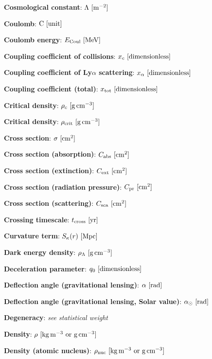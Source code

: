 \documentclass[a4paper,10pt]{article}
\begin{document}
{\noindent}\textbf{Cosmological constant}: $\Lambda ~ [{\rm m^{-2}}]$

{\noindent}\textbf{Coulomb}: ${\rm C} ~ [{\rm unit}]$

{\noindent}\textbf{Coulomb energy}: $E_{\rm Coul} ~ [{\rm MeV}]$

{\noindent}\textbf{Coupling coefficient of collisions}: $x_c ~ [{\rm dimensionless}]$

{\noindent}\textbf{Coupling coefficient of Ly$\alpha$ scattering}: $x_\alpha ~ [{\rm dimensionless}]$

{\noindent}\textbf{Coupling coefficient (total)}: $x_\mathrm{tot} ~ [{\rm dimensionless}]$

{\noindent}\textbf{Critical density}: $\rho_c ~ [{\rm g\,cm^{-3}}]$

{\noindent}\textbf{Critical density}: $\rho_\mathrm{crit} ~ [{\rm g\,cm^{-3}}]$

{\noindent}\textbf{Cross section}: $\sigma ~ [{\rm cm^{2}}]$

{\noindent}\textbf{Cross section (absorption)}: $C_{\rm abs} ~ [{\rm cm^{2}}]$

{\noindent}\textbf{Cross section (extinction)}: $C_{\rm ext} ~ [{\rm cm^{2}}]$

{\noindent}\textbf{Cross section (radiation pressure)}: $C_{\rm pr} ~ [{\rm cm^{2}}]$

{\noindent}\textbf{Cross section (scattering)}: $C_{\rm sca} ~ [{\rm cm^{2}}]$

{\noindent}\textbf{Crossing timescale}: $t_\mathrm{cross} ~ [{\rm yr}]$

{\noindent}\textbf{Curvature term}: $S_\kappa(r) ~ [{\rm Mpc}]$

{\noindent}\textbf{Dark energy density}: $\rho_\Lambda ~ [{\rm g\,cm^{-3}}]$

{\noindent}\textbf{Deceleration parameter}: $q_0 ~ [{\rm dimensionless}]$

{\noindent}\textbf{Deflection angle (gravitational lensing)}: $\alpha ~ [{\rm rad}]$

{\noindent}\textbf{Deflection angle (gravitational lensing, Solar value)}: $\alpha_\odot ~ [{\rm rad}]$

{\noindent}\textbf{Degeneracy}: \textit{see statistical weight}

{\noindent}\textbf{Density}: $\rho ~ [{\rm kg\,m^{-3}~{\rm or}~g\,cm^{-3}}]$

{\noindent}\textbf{Density (atomic nucleus)}: $\rho_{\rm nuc} ~ [{\rm kg\,m^{-3}~{\rm or}~g\,cm^{-3}}]$
\end{document}
